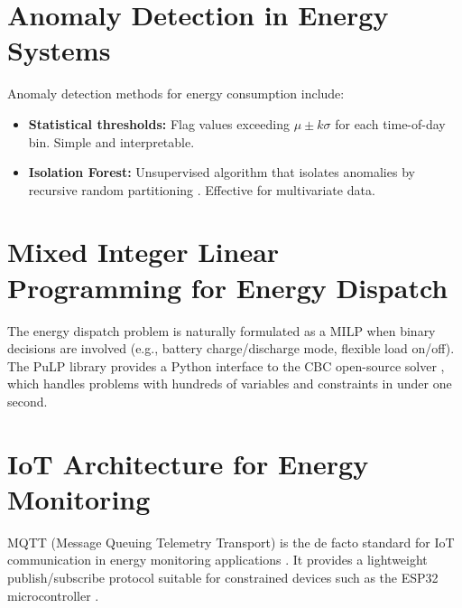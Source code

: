 \section{Anomaly Detection in Energy Systems}

Anomaly detection methods for energy consumption include:

\begin{itemize}[nosep]
    \item \textbf{Statistical thresholds:} Flag values exceeding $\mu \pm k\sigma$ for each time-of-day bin. Simple and interpretable.
    \item \textbf{Isolation Forest:} Unsupervised algorithm that isolates anomalies by recursive random partitioning \cite{isolationforest}. Effective for multivariate data.
\end{itemize}

\section{Mixed Integer Linear Programming for Energy Dispatch}

The energy dispatch problem is naturally formulated as a MILP when binary decisions are involved (e.g., battery charge/discharge mode, flexible load on/off). The PuLP library provides a Python interface to the CBC open-source solver \cite{pulp}, which handles problems with hundreds of variables and constraints in under one second.

\section{IoT Architecture for Energy Monitoring}

MQTT (Message Queuing Telemetry Transport) is the de facto standard for IoT communication in energy monitoring applications \cite{mqtt}. It provides a lightweight publish/subscribe protocol suitable for constrained devices such as the ESP32 microcontroller \cite{esp32}.
